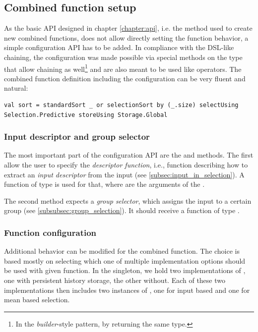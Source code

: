 \subsection{Combined function setup}
\label{subsec:function_setup}

As the basic API designed in chapter \ref{chapter:api}, i.e. the  method used to create new combined functions, does not allow directly setting the function behavior, a simple configuration API has to be added. In compliance with the DSL-like  chaining, the configuration was made possible via special methods on the  type that allow chaining as well\footnote{In the \textit{builder}-style pattern, by returning the same type.} and are also meant to be used like operators. The combined function definition including the configuration can be very fluent and natural:

\lstset{style=Scala}
\begin{lstlisting}
val sort = standardSort _ or selectionSort by (_.size) selectUsing Selection.Predictive storeUsing Storage.Global
\end{lstlisting}

\subsubsection{Input descriptor and group selector}

The most important part of the configuration API are the  and  methods. The first allow the user to specify the \textit{descriptor function}, i.e., function describing how to extract an \textit{input descriptor} from the input (see \ref{subsec:input_in_selection}). A function of type  is used for that, where  are the arguments of the . 

The second method expects a \textit{group selector}, which assigns the input to a certain group (see \ref{subsubsec:group_selection}). It should receive a function of type .

\subsubsection{Function configuration}

Additional behavior can be modified for the combined function. The choice is based mostly on selecting which one of multiple implementation options should be used with given function. In the  singleton, we hold two implementations of , one with persistent history storage, the other without. Each of these two implementations then includes two instances of  , one for input based and one for mean based selection.

